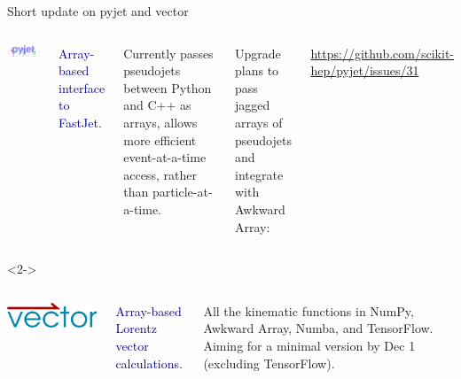 \documentclass[aspectratio=169]{beamer}
\begin{document}
\begin{frame}{Short update on pyjet and vector}
\large
\vspace{0.5 cm}
\begin{columns}
\hfill \includegraphics[width=0.9\linewidth]{logo-pyjet.pdf}

\textcolor{darkblue}{\Large Array-based interface to FastJet.}

\vspace{0.25 cm}
Currently passes pseudojets between Python and C++ as arrays, allows more efficient event-at-a-time access, rather than particle-at-a-time.

\vspace{0.25 cm}
Upgrade plans to pass jagged arrays of pseudojets and integrate with Awkward Array:

\textcolor{blue}{\small \url{https://github.com/scikit-hep/pyjet/issues/31}}

\end{columns}

\vspace{0.75 cm}
\begin{uncoverenv}<2->
\begin{columns}
\hfill \includegraphics[width=0.9\linewidth]{logo-vector.pdf}

\textcolor{darkblue}{\Large Array-based Lorentz vector calculations.}

\vspace{0.25 cm}
All the kinematic functions in NumPy, Awkward Array, Numba, and TensorFlow. Aiming for a minimal version by Dec 1 (excluding TensorFlow).

\end{columns}
\end{uncoverenv}
\end{frame}
\end{document}
